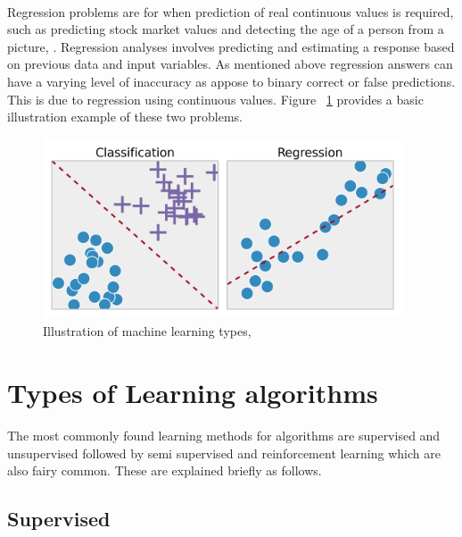 \paragraph{}Regression problems are for when prediction of real continuous values is required, such as predicting stock market values and detecting the age of a person from a picture, \cite{pythonML}. Regression analyses involves predicting and estimating a response based on previous data and input variables. As mentioned above regression answers can have a varying level of inaccuracy as appose to binary correct or false predictions. This is due to regression using continuous values.
Figure ~\ref{fig:regvsclass}  provides a basic illustration example of these two problems.

\begin{figure} 
   \centering
   \includegraphics[width=0.95\textwidth]{Figures/ml.png}
   \caption[Illustration of machine learning types]{ Illustration of machine learning types, ~\cite{pythonML}}
   \label{fig:regvsclass}
\end{figure}


\section{Types of Learning algorithms}
\label{sec:section5}

\paragraph{}The most commonly found learning methods for algorithms are supervised and unsupervised followed by semi supervised and reinforcement learning which are also fairy common. These are explained briefly as follows.

\subsection{Supervised}
\label{ssec:subsection3}

